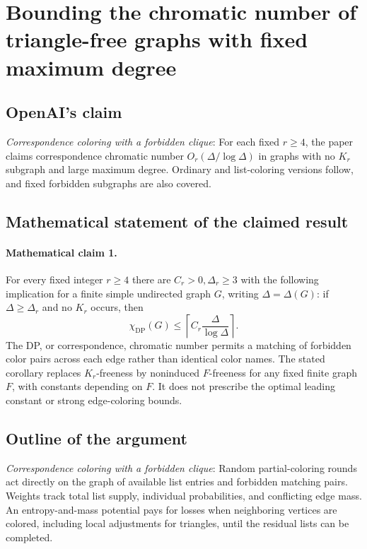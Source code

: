 \documentclass[11pt]{article}
\begin{document}
\section*{Bounding the chromatic number of triangle-free graphs with fixed maximum degree}

\subsection{OpenAI's claim}
\textit{Correspondence coloring with a forbidden clique}: For each fixed $r\ge4$, the paper claims correspondence chromatic number $O_r(\Delta/\log\Delta)$ in graphs with no $K_r$ subgraph and large maximum degree. Ordinary and list-coloring versions follow, and fixed forbidden subgraphs are also covered.

\subsection{Mathematical statement of the claimed result}
\paragraph{Mathematical claim 1.} For every fixed integer $r\ge4$ there are $C_r>0,\Delta_r\ge3$ with the following implication for a finite simple undirected graph $G$, writing $\Delta=\Delta(G)$: if $\Delta\ge\Delta_r$ and no $K_r$ occurs, then \[\chi_{\mathrm{DP}}(G)\le\left\lceil C_r\frac\Delta{\log\Delta}\right\rceil.\] The DP, or correspondence, chromatic number permits a matching of forbidden color pairs across each edge rather than identical color names. The stated corollary replaces $K_r$-freeness by noninduced $F$-freeness for any fixed finite graph $F$, with constants depending on $F$. It does not prescribe the optimal leading constant or strong edge-coloring bounds.

\subsection{Outline of the argument}
\textit{Correspondence coloring with a forbidden clique}: Random partial-coloring rounds act directly on the graph of available list entries and forbidden matching pairs. Weights track total list supply, individual probabilities, and conflicting edge mass. An entropy-and-mass potential pays for losses when neighboring vertices are colored, including local adjustments for triangles, until the residual lists can be completed.
\end{document}
